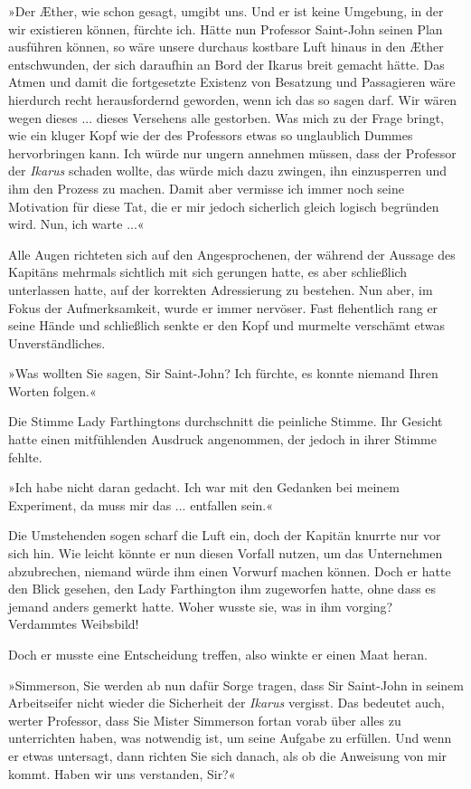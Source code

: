 »Der Æther, wie schon gesagt, umgibt uns. Und er ist keine
Umgebung, in der wir existieren können, fürchte ich. Hätte nun
Professor Saint-John seinen Plan ausführen können, so wäre unsere
durchaus kostbare Luft hinaus in den Æther entschwunden, der sich
daraufhin an Bord der Ikarus breit gemacht hätte. Das Atmen und
damit die fortgesetzte Existenz von Besatzung und Passagieren wäre
hierdurch recht herausfordernd geworden, wenn ich das so sagen
darf. Wir wären wegen dieses ... dieses Versehens alle gestorben.
Was mich zu der Frage bringt, wie ein kluger Kopf wie der des
Professors etwas so unglaublich Dummes hervorbringen kann. Ich
würde nur ungern annehmen müssen, dass der Professor der
\emph{Ikarus} schaden wollte, das würde mich dazu zwingen, ihn
einzusperren und ihm den Prozess zu machen. Damit aber vermisse ich
immer noch seine Motivation für diese Tat, die er mir jedoch
sicherlich gleich logisch begründen wird. Nun, ich warte ...«

\bigpar

Alle Augen richteten sich auf den Angesprochenen, der während der
Aussage des Kapitäns mehrmals sichtlich mit sich gerungen hatte, es
aber schließlich unterlassen hatte, auf der korrekten Adressierung
zu bestehen. Nun aber, im Fokus der Aufmerksamkeit, wurde er immer
nervöser. Fast flehentlich rang er seine Hände und schließlich
senkte er den Kopf und murmelte verschämt etwas Unverständliches.

»Was wollten Sie sagen, Sir Saint-John? Ich fürchte, es konnte
niemand Ihren Worten folgen.«

Die Stimme Lady Farthingtons durchschnitt die peinliche Stimme. Ihr
Gesicht hatte einen mitfühlenden Ausdruck angenommen, der jedoch in
ihrer Stimme fehlte.

»Ich habe nicht daran gedacht. Ich war mit den Gedanken bei meinem
Experiment, da muss mir das ... entfallen sein.«

Die Umstehenden sogen scharf die Luft ein, doch der Kapitän knurrte
nur vor sich hin. Wie leicht könnte er nun diesen Vorfall nutzen,
um das Unternehmen abzubrechen, niemand würde ihm einen Vorwurf
machen können. Doch er hatte den Blick gesehen, den Lady
Farthington ihm zugeworfen hatte, ohne dass es jemand anders
gemerkt hatte. Woher wusste sie, was in ihm vorging? Verdammtes
Weibsbild!

Doch er musste eine Entscheidung treffen, also winkte er einen Maat
heran.

»Simmerson, Sie werden ab nun dafür Sorge tragen, dass Sir
Saint-John in seinem Arbeitseifer nicht wieder die Sicherheit der
\emph{Ikarus} vergisst. Das bedeutet auch, werter Professor, dass
Sie Mister Simmerson fortan vorab über alles zu unterrichten haben,
was notwendig ist, um seine Aufgabe zu erfüllen. Und wenn er etwas
untersagt, dann richten Sie sich danach, als ob die Anweisung von
mir kommt. Haben wir uns verstanden, Sir?«

